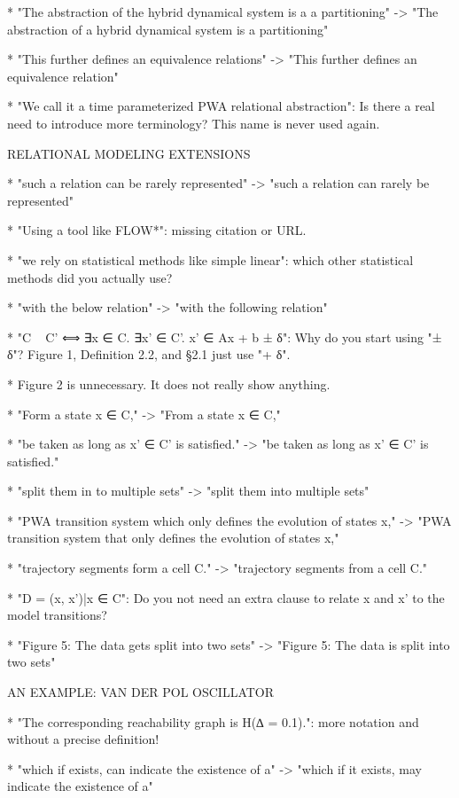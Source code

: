 * "The abstraction of the hybrid dynamical system is a a partitioning"
-> "The abstraction of a hybrid dynamical system is a partitioning"

* "This further defines an equivalence relations"
-> "This further defines an equivalence relation"

* "We call it a time parameterized PWA relational abstraction": Is there
  a real need to introduce more terminology? This name is never used again.

RELATIONAL MODELING EXTENSIONS

* "such a relation can be rarely represented"
-> "such a relation can rarely be represented"

* "Using a tool like FLOW*": missing citation or URL.

* "we rely on statistical methods like simple linear": which other
  statistical methods did you actually use?

* "with the below relation"
-> "with the following relation"

* "C ~ C' ⟺  ∃x ∈ C. ∃x' ∈ C'. x' ∈ Ax + b ± δ": Why do you start
using "±
  δ"? Figure 1, Definition 2.2, and §2.1 just use "+ δ".

* Figure 2 is unnecessary. It does not really show anything.

* "Form a state x ∈ C,"
-> "From a state x ∈ C,"

* "be taken as long as x' ∈ C’ is satisfied."
-> "be taken as long as x' ∈ C' is satisfied."

* "split them in to multiple sets"
-> "split them into multiple sets"

* "PWA transition system which only defines the evolution of states x,"
-> "PWA transition system that only defines the evolution of states x,"

* "trajectory segments form a cell C."
-> "trajectory segments from a cell C."

* "D = {(x, x')|x ∈ C}": Do you not need an extra clause to relate x and x'
  to the model transitions?

* "Figure 5: The data gets split into two sets"
-> "Figure 5: The data is split into two sets"

AN EXAMPLE: VAN DER POL OSCILLATOR

* "The corresponding reachability graph is H(∆ = 0.1).": more notation and
  without a precise definition!

* "which if exists, can indicate the existence of a"
-> "which if it exists, may indicate the existence of a"

